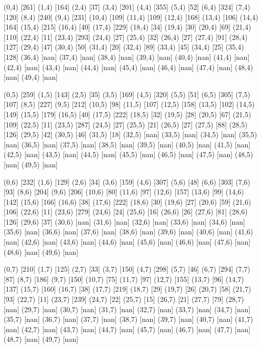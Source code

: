 {(0,4) [261] (1,4) [164] (2,4) [37] (3,4) [201] (4,4) [355] (5,4) [52] (6,4) [324] (7,4) [120] (8,4) [240] (9,4) [231] (10,4) [109] (11,4) [109] (12,4) [168] (13,4) [106] (14,4) [164] (15,4) [215] (16,4) [40] (17,4) [229] (18,4) [34] (19,4) [30] (20,4) [69] (21,4) [110] (22,4) [11] (23,4) [293] (24,4) [27] (25,4) [32] (26,4) [27] (27,4) [91] (28,4) [127] (29,4) [47] (30,4) [50] (31,4) [20] (32,4) [89] (33,4) [45] (34,4) [25] (35,4) [128] (36,4) [nan] (37,4) [nan] (38,4) [nan] (39,4) [nan] (40,4) [nan] (41,4) [nan] (42,4) [nan] (43,4) [nan] (44,4) [nan] (45,4) [nan] (46,4) [nan] (47,4) [nan] (48,4) [nan] (49,4) [nan] 

(0,5) [259] (1,5) [143] (2,5) [35] (3,5) [169] (4,5) [320] (5,5) [51] (6,5) [305] (7,5) [107] (8,5) [227] (9,5) [212] (10,5) [98] (11,5) [107] (12,5) [158] (13,5) [102] (14,5) [149] (15,5) [179] (16,5) [40] (17,5) [222] (18,5) [32] (19,5) [28] (20,5) [67] (21,5) [109] (22,5) [11] (23,5) [287] (24,5) [27] (25,5) [21] (26,5) [27] (27,5) [88] (28,5) [126] (29,5) [42] (30,5) [46] (31,5) [18] (32,5) [nan] (33,5) [nan] (34,5) [nan] (35,5) [nan] (36,5) [nan] (37,5) [nan] (38,5) [nan] (39,5) [nan] (40,5) [nan] (41,5) [nan] (42,5) [nan] (43,5) [nan] (44,5) [nan] (45,5) [nan] (46,5) [nan] (47,5) [nan] (48,5) [nan] (49,5) [nan] 

(0,6) [232] (1,6) [129] (2,6) [34] (3,6) [159] (4,6) [307] (5,6) [48] (6,6) [303] (7,6) [93] (8,6) [204] (9,6) [206] (10,6) [80] (11,6) [97] (12,6) [157] (13,6) [99] (14,6) [142] (15,6) [166] (16,6) [38] (17,6) [222] (18,6) [30] (19,6) [27] (20,6) [59] (21,6) [106] (22,6) [11] (23,6) [279] (24,6) [24] (25,6) [16] (26,6) [26] (27,6) [81] (28,6) [126] (29,6) [37] (30,6) [nan] (31,6) [nan] (32,6) [nan] (33,6) [nan] (34,6) [nan] (35,6) [nan] (36,6) [nan] (37,6) [nan] (38,6) [nan] (39,6) [nan] (40,6) [nan] (41,6) [nan] (42,6) [nan] (43,6) [nan] (44,6) [nan] (45,6) [nan] (46,6) [nan] (47,6) [nan] (48,6) [nan] (49,6) [nan] 

(0,7) [210] (1,7) [125] (2,7) [33] (3,7) [150] (4,7) [298] (5,7) [46] (6,7) [294] (7,7) [87] (8,7) [186] (9,7) [150] (10,7) [75] (11,7) [97] (12,7) [155] (13,7) [96] (14,7) [137] (15,7) [160] (16,7) [38] (17,7) [219] (18,7) [29] (19,7) [26] (20,7) [58] (21,7) [93] (22,7) [11] (23,7) [239] (24,7) [22] (25,7) [15] (26,7) [21] (27,7) [79] (28,7) [nan] (29,7) [nan] (30,7) [nan] (31,7) [nan] (32,7) [nan] (33,7) [nan] (34,7) [nan] (35,7) [nan] (36,7) [nan] (37,7) [nan] (38,7) [nan] (39,7) [nan] (40,7) [nan] (41,7) [nan] (42,7) [nan] (43,7) [nan] (44,7) [nan] (45,7) [nan] (46,7) [nan] (47,7) [nan] (48,7) [nan] (49,7) [nan] 

}
